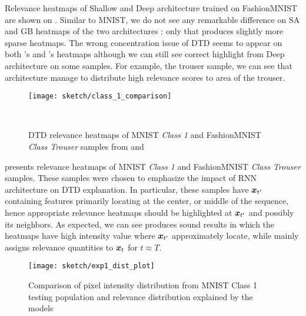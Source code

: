 Relevance heatmaps of Shallow and Deep architecture trained on  FashionMNIST  are shown on \addfigure{\ref{fig:fashion_mnist_experiment}}. Similar to MNIST, we do not see any remarkable difference on SA and GB heatmaps of the two architectures : only that  produces slightly more sparse heatmaps. The wrong concentration issue of DTD  seems to appear on both 's and 's heatmaps although we can still see correct highlight from Deep architecture on some samples. For example, the trouser sample, we can see  that  architecture manage to distribute high relevance scores to area of the trouser.






 \begin{figure}[ht!]
\centering
\texttt{[image: sketch/class\_1\_comparison]}
\caption{DTD relevance heatmaps of MNIST \textit{Class 1} and FashionMNIST \textit{Class Trouser} samples from  and  }\\
\label{fig:class_1_comparison}
\end{figure}

\addfigure{\ref{fig:class_1_comparison}} presents relevance heatmaps of MNIST \textit{Class 1} and FashionMNIST \textit{Class Trouser} samples. These samples were chosen to emphasize the impact of RNN architecture on DTD explanation. In particular,  these samples have $\boldsymbol{x}_{t'}$ containing features  primarily locating at the center, or middle of the sequence, hence appropriate relevance heatmaps should be highlighted at $\boldsymbol{x}_{t'}$ and possibly its neighbors.  As expected, we can see  produces sound results in which the  heatmaps have high intensity value where $\boldsymbol{x}_{t'}$ approximately locate, while  mainly assigns relevance quantities to $\boldsymbol{x}_{t}$ for $t \approx T$.


 \begin{figure}[h]
\centering
\texttt{[image: sketch/exp1\_dist\_plot]}
\caption{Comparison of pixel intensity distribution from MNIST Class 1 testing population and relevance distribution explained by the models} 
\label{fig:exp1_dist_plot}
\end{figure}

%
%
%


